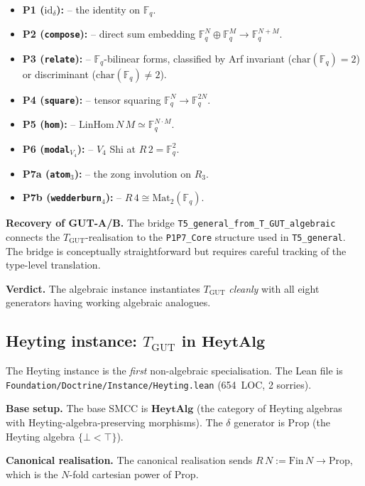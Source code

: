 \documentclass[11pt,a4paper]{article}
\theoremstyle{plain}
\theoremstyle{definition}
\theoremstyle{remark}
\newcommand{\F}{\mathbb{F}}
\newcommand{\cat}[1]{\mathbf{#1}}
\newcommand{\HeytAlg}{\cat{HeytAlg}}
\newcommand{\Mat}{\mathrm{Mat}}
\newcommand{\id}{\mathrm{id}}
\newcommand{\TGUT}{T_{\mathrm{GUT}}}
\newcommand{\smcc}{SMCC}
\begin{document}
\begin{itemize}[leftmargin=*]
\item \textbf{P1 ($\id_\delta$):} \checkmark{} -- the identity on $\F_q$.
\item \textbf{P2 (\texttt{compose}):} \checkmark{} -- direct sum embedding $\F_q^N \oplus \F_q^M \to \F_q^{N+M}$.
\item \textbf{P3 (\texttt{relate}):} \checkmark{} -- $\F_q$-bilinear forms, classified by Arf invariant ($\mathrm{char}(\F_q) = 2$) or discriminant ($\mathrm{char}(\F_q) \neq 2$).
\item \textbf{P4 (\texttt{square}):} \checkmark{} -- tensor squaring $\F_q^N \to \F_q^{2N}$.
\item \textbf{P5 (\texttt{hom}):} \checkmark{} -- $\mathrm{LinHom}\,N\,M \simeq \F_q^{N\cdot M}$.
\item \textbf{P6 (\texttt{modal}$_{V_4}$):} \checkmark{} -- $V_4$ Shi at $R\,2 = \F_q^2$.
\item \textbf{P7a (\texttt{atom}$_3$):} \checkmark{} -- the zong involution on $R_3$.
\item \textbf{P7b (\texttt{wedderburn}$_4$):} \checkmark{} -- $R\,4 \cong \Mat_2(\F_q)$.
\end{itemize}

\textbf{Recovery of GUT-A/B.} The bridge \texttt{T5\_general\_from\_T\_GUT\_algebraic} connects the $\TGUT$-realisation to the \texttt{P1P7\_Core} structure used in \texttt{T5\_general}. The bridge is conceptually straightforward but requires careful tracking of the type-level translation.

\textbf{Verdict.} The algebraic instance instantiates $\TGUT$ \emph{cleanly} with all eight generators having working algebraic analogues.

\subsection{Heyting instance: $\TGUT$ in $\HeytAlg$}\label{sec:inst:heyting}

The Heyting instance is the \emph{first} non-algebraic specialisation. The Lean file is \texttt{Foundation/Doctrine/Instance/Heyting.lean} (654~LOC, 2 sorries).

\textbf{Base setup.} The base \smcc{} is $\HeytAlg$ (the category of Heyting algebras with Heyting-algebra-preserving morphisms). The $\delta$ generator is $\mathrm{Prop}$ (the Heyting algebra $\{\bot < \top\}$).

\textbf{Canonical realisation.} The canonical realisation sends $R\,N := \mathrm{Fin}\,N \to \mathrm{Prop}$, which is the $N$-fold cartesian power of $\mathrm{Prop}$.
\end{document}
